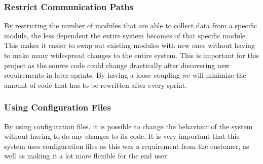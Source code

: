 \subsubsection{Restrict Communication Paths}
By restricting the number of modules that are able to collect data from a specific module, the less dependent the entire system becomes of that specific module. This makes it easier to swap out existing modules with new ones without having to make many widespread changes to the entire system. This is important for this project as the source code could change drastically after discovering new requirements in later sprints. By having a loose coupling we will minimize the amount of code that has to be rewritten after every sprint.

\subsubsection{Using Configuration Files}
By using configuration files, it is possible to change the behaviour of the system without having to do any changes to its code. It is very important that this system uses configuration files as this was a requirement from the customer, as well as making it a lot more flexible for the end user.




